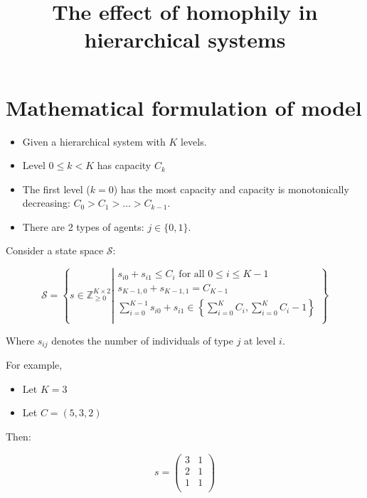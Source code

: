 \documentclass{article}
\title{The effect of homophily in hierarchical systems}
\renewcommand{\S}{\mathcal{S}}
\begin{document}
\maketitle


\section{Mathematical formulation of model}

\begin{itemize}
    \item Given a hierarchical system with \(K\) levels.
    \item Level \(0\leq k < K\) has capacity \(C_k\)
    \item The first level (\(k=0\)) has the most capacity and capacity is
        monotonically decreasing: \(C_0 > C_1 > \dots > C_{k-1}\).
    \item There are 2 types of agents: \(j\in\{0, 1\}\).
\end{itemize}

Consider a state space \(\S\):

\begin{equation}\label{eqn:state_space}
    \S = \left\{s \in \mathbb{Z} ^ {K \times 2} _ {\geq 0}\left|
        \begin{array}{l}
        s_{i0} + s_{i1} \leq C_i\text{ for all }0\leq i \leq K - 1\\
        s_{K-1,0} + s_{K-1,1} = C_{K - 1}\\
        \sum_{i=0}^{K - 1}s_{i0} + s_{i1} \in\left\{\sum_{i=0}^{K}C_i, \sum_{i=0}^{K}C_i - 1\right\}\\

        \end{array}
                \right.\right\}
\end{equation}

Where \(s_{ij}\) denotes the number of individuals of type \(j\) at level \(i\).

For example,

\begin{itemize}
    \item Let \(K = 3\)
    \item Let \(C = (5, 3, 2)\)
\end{itemize}

Then:

\[
    s = \begin{pmatrix}
        3 & 1 \\
        2 & 1 \\
        1 & 1 \\
    \end{pmatrix}
\]
\end{document}
